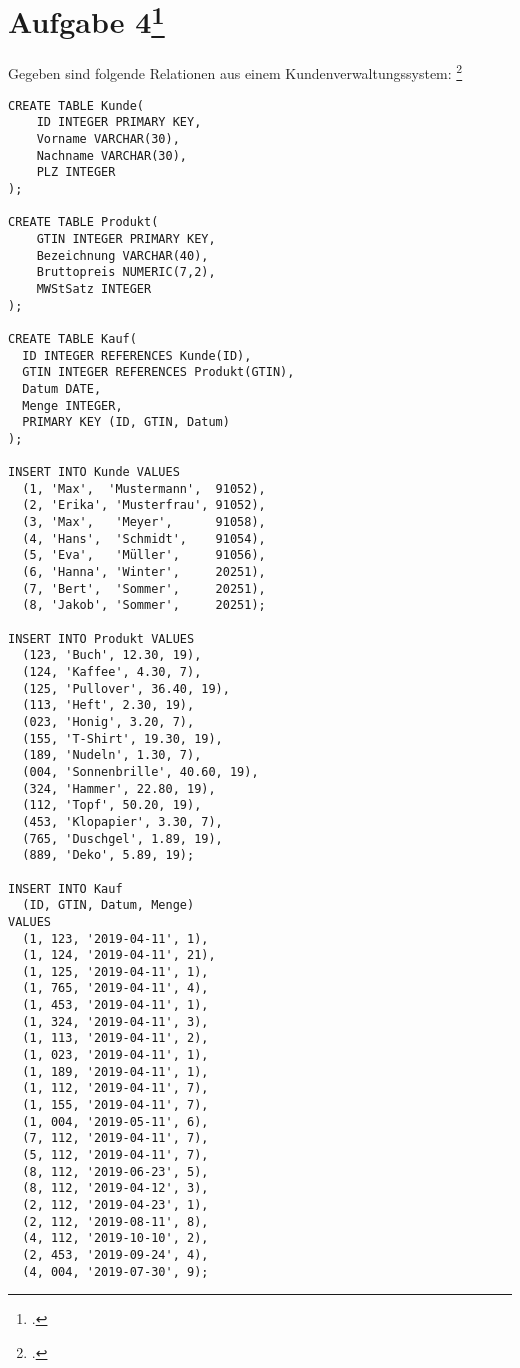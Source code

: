 \documentclass{bschlangaul-aufgabe}
\begin{document}

\section{Aufgabe 4\footcite[Aufgabe 2]{db:pu:3}}
Gegeben sind folgende Relationen aus einem Kundenverwaltungssystem:
\footcite[Thema 1 Teilaufgabe 1 ]{examen:46116:2018:09}

\begin{liRmodell}
\end{liRmodell}

\begin{verbatim}
CREATE TABLE Kunde(
	ID INTEGER PRIMARY KEY,
	Vorname VARCHAR(30),
	Nachname VARCHAR(30),
	PLZ INTEGER
);

CREATE TABLE Produkt(
	GTIN INTEGER PRIMARY KEY,
	Bezeichnung VARCHAR(40),
	Bruttopreis NUMERIC(7,2),
	MWStSatz INTEGER
);

CREATE TABLE Kauf(
  ID INTEGER REFERENCES Kunde(ID),
  GTIN INTEGER REFERENCES Produkt(GTIN),
  Datum DATE,
  Menge INTEGER,
  PRIMARY KEY (ID, GTIN, Datum)
);

INSERT INTO Kunde VALUES
  (1, 'Max',  'Mustermann',  91052),
  (2, 'Erika', 'Musterfrau', 91052),
  (3, 'Max',   'Meyer',      91058),
  (4, 'Hans',  'Schmidt',    91054),
  (5, 'Eva',   'Müller',     91056),
  (6, 'Hanna', 'Winter',     20251),
  (7, 'Bert',  'Sommer',     20251),
  (8, 'Jakob', 'Sommer',     20251);

INSERT INTO Produkt VALUES
  (123, 'Buch', 12.30, 19),
  (124, 'Kaffee', 4.30, 7),
  (125, 'Pullover', 36.40, 19),
  (113, 'Heft', 2.30, 19),
  (023, 'Honig', 3.20, 7),
  (155, 'T-Shirt', 19.30, 19),
  (189, 'Nudeln', 1.30, 7),
  (004, 'Sonnenbrille', 40.60, 19),
  (324, 'Hammer', 22.80, 19),
  (112, 'Topf', 50.20, 19),
  (453, 'Klopapier', 3.30, 7),
  (765, 'Duschgel', 1.89, 19),
  (889, 'Deko', 5.89, 19);

INSERT INTO Kauf
  (ID, GTIN, Datum, Menge)
VALUES
  (1, 123, '2019-04-11', 1),
  (1, 124, '2019-04-11', 21),
  (1, 125, '2019-04-11', 1),
  (1, 765, '2019-04-11', 4),
  (1, 453, '2019-04-11', 1),
  (1, 324, '2019-04-11', 3),
  (1, 113, '2019-04-11', 2),
  (1, 023, '2019-04-11', 1),
  (1, 189, '2019-04-11', 1),
  (1, 112, '2019-04-11', 7),
  (1, 155, '2019-04-11', 7),
  (1, 004, '2019-05-11', 6),
  (7, 112, '2019-04-11', 7),
  (5, 112, '2019-04-11', 7),
  (8, 112, '2019-06-23', 5),
  (8, 112, '2019-04-12', 3),
  (2, 112, '2019-04-23', 1),
  (2, 112, '2019-08-11', 8),
  (4, 112, '2019-10-10', 2),
  (2, 453, '2019-09-24', 4),
  (4, 004, '2019-07-30', 9);
\end{verbatim}
\end{document}
